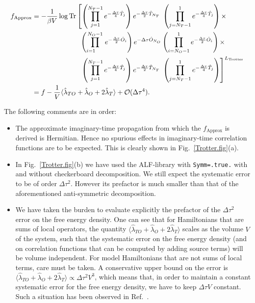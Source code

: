 \begin{align}
f_{\text{Approx} }  &=  
\begin{aligned}[t]
   -\frac{1}{\beta V } \log \mathop{\mathrm{Tr}} &\left[ \left(\prod_{j=1}^{N_T-1} e^{-\frac{\Delta \tau}{4} \hat{T}_j } \right)    e^{-\frac{\Delta \tau}{2} \hat{T}_{N_T} } \;   
   \left(  \prod_{j=N_T-1}^{1} e^{-\frac{\Delta \tau}{4} \hat{T}_j } \right)  \times   \right. \nonumber \\   
   &\;\;\left(\prod_{i=1\phantom{N_O}}^{N_O-1} e^{-\frac{\Delta \tau}{2} \hat{O}_i } \right)    e^{-\Delta \tau \hat{O}_{N_O} }    
     \left( \prod_{i=N_O-1}^{1} e^{-\frac{\Delta \tau}{2} \hat{O}_i } \right)  \times  \nonumber  \\
   &\;\;\left.   \left(\prod_{j=1}^{N_T-1} e^{-\frac{\Delta \tau}{4} \hat{T}_j } \right)    e^{-\frac{\Delta \tau}{2} \hat{T}_{N_T} }  \;  
   \left(  \prod_{j=N_T-1}^{1} e^{-\frac{\Delta \tau}{4} \hat{T}_j } \right)   
   \right]^{L_{\text{Trotter}}}  \nonumber 
\end{aligned}\\
   &= f    - \frac{1}{V}   \langle \hat{\lambda}_{TO} + \hat{\lambda}_{O} + 2 \hat{\lambda}_{T} \rangle  + \mathcal{O}( \Delta \tau ^4).
\end{align}

The following comments are in order:
\begin{itemize}
\item   The approximate imaginary-time propagation from which the $f_{\text{Approx} } $ is derived is Hermitian.  Hence no spurious effects in imaginary-time correlation functions are to be expected.  This is clearly shown in Fig.~\ref{Trotter.fig}(a).
\item  In Fig.~\ref{Trotter.fig}(b) we  have used the ALF-library with   \texttt{Symm=.true.}  with and without checkerboard decomposition.  We still expect the systematic error to be of order $\Delta \tau ^2 $.  However its prefactor is much smaller than that of the aforementioned  anti-symmetric decomposition.
\item   We have taken the burden to evaluate explicitly the prefactor of the $\Delta \tau ^2$ error on the free energy density.  One can  see that for Hamiltonians  that are sums of local  operators, the quantity $ \langle \hat{\lambda}_{TO} + \hat{\lambda}_{O} + 2 \hat{\lambda}_{T} \rangle  $ scales as the volume $V$  of the system, such that the systematic error on the free energy density (and on correlation functions that can be computed  by adding source terms)  will be  volume  independent. For model  Hamiltonians that are not sums of local terms, care must be taken.  A conservative upper bound on the  error is $ \langle \hat{\lambda}_{TO} + \hat{\lambda}_{O} + 2 \hat{\lambda}_{T} \rangle    \propto \Delta \tau^2 V^3 $, which means that, in order to maintain a constant systematic error for the free energy density, we have to keep $ \Delta \tau V $ constant. Such a situation has been observed in Ref.~\cite{WangZ20}.
\end{itemize}



